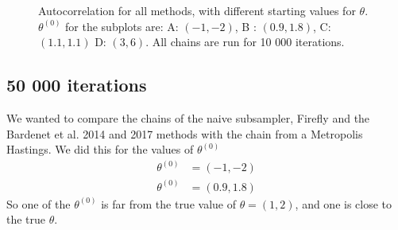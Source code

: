 \begin{figure}[ht]
    \caption{Autocorrelation for all methods, with different starting values for $\theta$. $\theta^{\left(0\right)}$ for the subplots are:   A: $(-1, -2)$, B : $(0.9, 1.8)$, C: $(1.1, 1.1)$ D: $(3, 6)$. All chains are run for 10 000 iterations.}%
    \label{fig:autocorrelation_10k_02_06}%
\end{figure}



\subsection{50 000 iterations}
We wanted to compare the chains of the naive subsampler, Firefly and the Bardenet et al. 2014 and 2017 methods with the chain from a Metropolis Hastings. We did this for the values of $\theta^{\left(0\right)}$
\begin{equation*}
\begin{split}
     \theta^{\left(0\right)} &= \left(-1, -2\right) \\
     \theta^{\left(0\right)} & = \left(0.9, 1.8\right)
\end{split}
\end{equation*}
So one of the $\theta^{\left(0\right)}$ is far from the true value of $\theta = \left(1,2\right)$, and one is close to the true $\theta$.   




